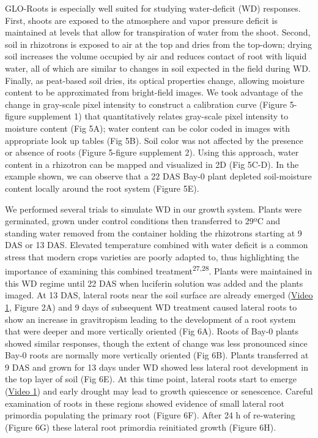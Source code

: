 \documentclass[]{article}
\begin{document}
GLO-Roots is especially well suited for studying water-deficit (WD)
responses. First, shoots are exposed to the atmosphere and vapor
pressure deficit is maintained at levels that allow for transpiration of
water from the shoot. Second, soil in rhizotrons is exposed to air at
the top and dries from the top-down; drying soil increases the volume
occupied by air and reduces contact of root with liquid water, all of
which are similar to changes in soil expected in the field during WD.
Finally, as peat-based soil dries, its optical properties change,
allowing moisture content to be approximated from bright-field images.
We took advantage of the change in gray-scale pixel intensity to
construct a calibration curve (Figure 5-figure supplement 1) that
quantitatively relates gray-scale pixel intensity to moisture content
(Fig 5A); water content can be color coded in images with appropriate
look up tables (Fig 5B). Soil color was not affected by the presence or
absence of roots (Figure 5-figure supplement 2). Using this approach,
water content in a rhizotron can be mapped and visualized in 2D (Fig
5C-D). In the example shown, we can observe that a 22 DAS Bay-0 plant
depleted soil-moisture content locally around the root system (Figure
5E).

We performed several trials to simulate WD in our growth system. Plants
were germinated, grown under control conditions then transferred to 29ºC
and standing water removed from the container holding the rhizotrons
starting at 9 DAS or 13 DAS. Elevated temperature combined with water
deficit is a common stress that modern crops varieties are poorly
adapted to, thus highlighting the importance of examining this combined
treatment\textsuperscript{27,28}. Plants were maintained in this WD
regime until 22 DAS when luciferin solution was added and the plants
imaged. At 13 DAS, lateral roots near the soil surface are already
emerged
(\href{https://www.dropbox.com/s/sxjc04o0yj2faif/Video_1.avi?dl=0}{Video
1}, Figure 2A) and 9 days of subsequent WD treatment caused lateral
roots to show an increase in gravitropism leading to the development of
a root system that were deeper and more vertically oriented (Fig 6A).
Roots of Bay-0 plants showed similar responses, though the extent of
change was less pronounced since Bay-0 roots are normally more
vertically oriented (Fig 6B). Plants transferred at 9 DAS and grown for
13 days under WD showed less lateral root development in the top layer
of soil (Fig 6E). At this time point, lateral roots start to emerge
(\href{https://www.dropbox.com/s/sxjc04o0yj2faif/Video_1.avi?dl=0}{Video
1}) and early drought may lead to growth quiescence or senescence.
Careful examination of roots in these regions showed evidence of small
lateral root primordia populating the primary root (Figure 6F). After 24
h of re-watering (Figure 6G) these lateral root primordia reinitiated
growth (Figure 6H).
\end{document}
